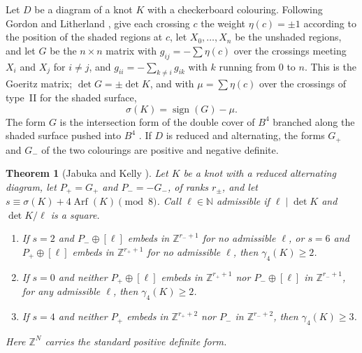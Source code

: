 \documentclass[11pt]{amsart}
\newtheorem{theorem}{Theorem}[section]
\theoremstyle{definition}
\theoremstyle{remark}
\numberwithin{equation}{section}
\begin{document}
Let $D$ be a diagram of a knot $K$ with a checkerboard colouring. Following Gordon and
Litherland \cite{GoL}, give each crossing $c$ the weight $\eta(c)=\pm1$ according to the
position of the shaded regions at $c$, let $X_0,\dots,X_n$ be the unshaded regions, and let
$G$ be the $n\times n$ matrix with $g_{ij}=-\sum\eta(c)$ over the crossings meeting $X_i$
and $X_j$ for $i\ne j$, and $g_{ii}=-\sum_{k\ne i}g_{ik}$ with $k$ running from $0$ to $n$.
This is the Goeritz matrix; $\det G=\pm\det K$, and with $\mu=\sum\eta(c)$ over the crossings
of type~II for the shaded surface,
\begin{equation}\label{eq:gl}
\sigma(K)=\operatorname{sign}(G)-\mu .
\end{equation}
The form $G$ is the intersection form of the double cover of $B^4$ branched along the shaded
surface pushed into $B^4$ \cite{GoL}. If $D$ is reduced and alternating, the forms $G_+$ and
$G_-$ of the two colourings are positive and negative definite.

\begin{theorem}[Jabuka and Kelly {\cite[Theorems 2.10--2.12]{JK}}]\label{thm:jk}
Let $K$ be a knot with a reduced alternating diagram, let $P_+=G_+$ and $P_-=-G_-$, of ranks
$r_\pm$, and let $s\equiv\sigma(K)+4\operatorname{Arf}(K)\pmod 8$. Call $\ell\in\mathbb N$
admissible if $\ell\mid\det K$ and $\det K/\ell$ is a square.
\begin{enumerate}
\item If $s=2$ and $P_-\oplus[\ell]$ embeds in $\mathbb Z^{r_-+1}$ for no admissible
$\ell$, or $s=6$ and $P_+\oplus[\ell]$ embeds in $\mathbb Z^{r_++1}$ for no admissible
$\ell$, then $\gamma_4(K)\ge2$.
\item If $s=0$ and neither $P_+\oplus[\ell]$ embeds in $\mathbb Z^{r_++1}$ nor
$P_-\oplus[\ell]$ in $\mathbb Z^{r_-+1}$, for any admissible $\ell$, then $\gamma_4(K)\ge2$.
\item If $s=4$ and neither $P_+$ embeds in $\mathbb Z^{r_++2}$ nor $P_-$ in
$\mathbb Z^{r_-+2}$, then $\gamma_4(K)\ge3$.
\end{enumerate}
Here $\mathbb Z^N$ carries the standard positive definite form.
\end{theorem}
\end{document}
